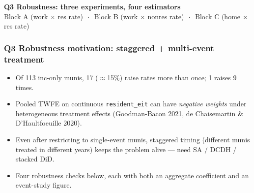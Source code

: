 \documentclass[xcolor = x11names, compress, aspectratio = 169]{beamer}
\renewcommand{\(}{\begin{columns}}
\renewcommand{\)}{\end{columns}}
\newcommand{\<}[1]{\begin{column}{#1}}
\renewcommand{\>}{\end{column}}
\begin{document}
\begin{frame}[plain]
    \centering
    \vfill
    \Large \textbf{Q3 Robustness: three experiments, four estimators}
    \normalsize
    \vspace{0.4cm}\\
    Block A (work $\times$ res rate) $\,\cdot\,$ Block B (work $\times$ nonres rate)
    $\,\cdot\,$ Block C (home $\times$ res rate)
    \vfill
\end{frame}

\begin{frame}
\frametitle{Q3 Robustness motivation: staggered + multi-event treatment}
    \small
    \begin{itemize}\setlength{\itemsep}{0.10cm}
        \item Of 113 inc-only munis, 17 ($\approx$15\%) raise rates more
        than once; 1 raises 9 times.
        \item Pooled TWFE on continuous \texttt{resident\_eit} can have
        \emph{negative weights} under heterogeneous treatment effects
        (Goodman-Bacon 2021, de Chaisemartin \& D'Haultfoeuille 2020).
        \item Even after restricting to single-event munis, staggered
        timing (different munis treated in different years) keeps the
        problem alive --- need SA / DCDH / stacked DiD.
        \item Four robustness checks below, each with both an aggregate
        coefficient and an event-study figure.
    \end{itemize}
\end{frame}
\end{document}
